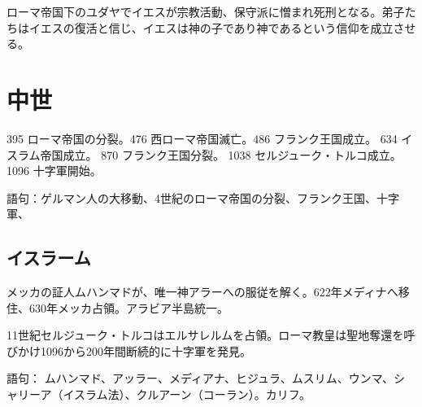 \documentclass[autodetect-engine,dvipdfmx-if-dvi,ja=standard]{jsarticle} \usepackage{mystyle}
\begin{document}
ローマ帝国下のユダヤでイエスが宗教活動、保守派に憎まれ死刑となる。弟子たちはイエスの復活と信じ、イエスは神の子であり神であるという信仰を成立させる。



\section{中世}

395 ローマ帝国の分裂。476 西ローマ帝国滅亡。486 フランク王国成立。
634 イスラム帝国成立。 870 フランク王国分裂。 1038 セルジューク・トルコ成立。1096 十字軍開始。


語句：ゲルマン人の大移動、4世紀のローマ帝国の分裂、フランク王国、十字軍、

\subsection{イスラーム}

メッカの証人ムハンマドが、唯一神アラーへの服従を解く。622年メディナへ移住、630年メッカ占領。アラビア半島統一。

11世紀セルジューク・トルコはエルサレルムを占領。ローマ教皇は聖地奪還を呼びかけ1096から200年間断続的に十字軍を発見。

語句： ムハンマド、アッラー、メディアナ、ヒジュラ、ムスリム、ウンマ、シャリーア（イスラム法）、クルアーン（コーラン）。カリフ。


\ifx\mybook\undefined
{}


\end{document}
